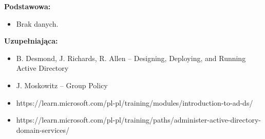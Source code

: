 \documentclass[12pt, a4paper]{article}
\begin{document}
\textbf{Podstawowa:}
\begin{itemize}
  \item Brak danych.
\end{itemize}

\textbf{Uzupełniająca:}
\begin{itemize}
  \item B. Desmond, J. Richards, R. Allen – Designing, Deploying, and Running Active Directory
  \item J. Moskowitz – Group Policy
  \item https://learn.microsoft.com/pl-pl/training/modules/introduction-to-ad-ds/
  \item https://learn.microsoft.com/pl-pl/training/paths/administer-active-directory-domain-services/
\end{itemize}
\end{document}
